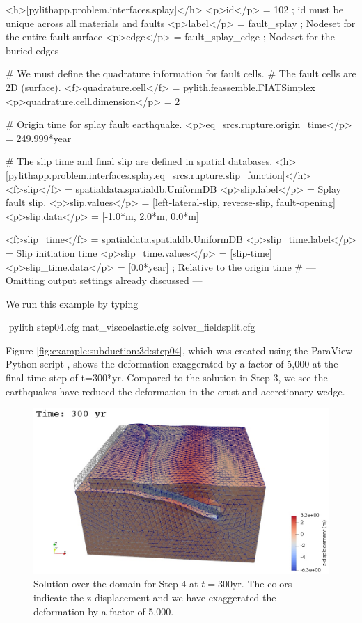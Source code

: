 \begin{cfg}
<h>[pylithapp.problem.interfaces.splay]</h>
<p>id</p> = 102 ; id must be unique across all materials and faults
<p>label</p> = fault_splay ; Nodeset for the entire fault surface
<p>edge</p> = fault_splay_edge ; Nodeset for the buried edges

# We must define the quadrature information for fault cells.
# The fault cells are 2D (surface).
<f>quadrature.cell</f> = pylith.feassemble.FIATSimplex
<p>quadrature.cell.dimension</p> = 2

# Origin time for splay fault earthquake.
<p>eq_srcs.rupture.origin_time</p> = 249.999*year

# The slip time and final slip are defined in spatial databases.
<h>[pylithapp.problem.interfaces.splay.eq_srcs.rupture.slip_function]</h>
<f>slip</f> = spatialdata.spatialdb.UniformDB
<p>slip.label</p> = Splay fault slip.
<p>slip.values</p> = [left-lateral-slip, reverse-slip, fault-opening]
<p>slip.data</p> = [-1.0*m, 2.0*m, 0.0*m]

<f>slip_time</f> = spatialdata.spatialdb.UniformDB
<p>slip_time.label</p>  = Slip initiation time
<p>slip_time.values</p> = [slip-time]
<p>slip_time.data</p> = [0.0*year] ; Relative to the origin time
# --- Omitting output settings already discussed ---
\end{cfg}

We run this example by typing
\begin{shell}
$$ pylith step04.cfg mat_viscoelastic.cfg solver_fieldsplit.cfg
\end{shell}

Figure \vref{fig:example:subduction:3d:step04}, which was created
using the ParaView Python script , shows
the deformation exaggerated by a factor of 5,000 at the final time
step of t=300*yr. Compared to the solution in Step 3, we see the
earthquakes have reduced the deformation in the crust and accretionary
wedge.

\begin{figure}
  \includegraphics[width=5.0in]{examples/figs/subduction3d_step04_soln}
  \caption{Solution over the domain for Step 4 at $t=300 \mathrm{yr}$. The colors indicate
    the z-displacement and we have exaggerated the
    deformation by a factor of 5,000.}
  \label{fig:example:subduction:3d:step04}
\end{figure}

